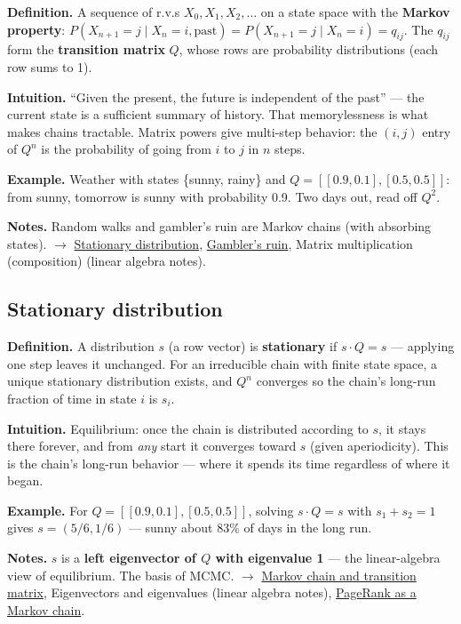 \documentclass[11pt,a4paper]{article}
\begin{document}
\textbf{Definition.} A sequence of r.v.s $X_{0}, X_{1}, X_{2}, \ldots$ on a state space with the \textbf{Markov property}: $P(X_{n+1} = j \mid X_{n} = i, \text{past}) = P(X_{n+1} = j \mid X_{n} = i) = q_{ij}$. The $q_{ij}$ form the \textbf{transition matrix} $Q$, whose rows are probability distributions (each row sums to 1).

\textbf{Intuition.} ``Given the present, the future is independent of the past'' --- the current state is a sufficient summary of history. That memorylessness is what makes chains tractable. Matrix powers give multi-step behavior: the $(i,j)$ entry of $Q^{n}$ is the probability of going from $i$ to $j$ in $n$ steps.

\textbf{Example.} Weather with states \{sunny, rainy\} and $Q = [[0.9, 0.1], [0.5, 0.5]]$: from sunny, tomorrow is sunny with probability 0.9. Two days out, read off $Q^{2}$.

\textbf{Notes.} Random walks and gambler's ruin are Markov chains (with absorbing states). $\to$ \hyperref[sec:stationary-distribution]{Stationary distribution}, \hyperref[sec:gamblers-ruin]{Gambler's ruin}, Matrix multiplication (composition) (linear algebra notes).

\subsection{Stationary distribution}\label{sec:stationary-distribution}

\textbf{Definition.} A distribution $s$ (a row vector) is \textbf{stationary} if $s\cdot Q = s$ --- applying one step leaves it unchanged. For an irreducible chain with finite state space, a unique stationary distribution exists, and $Q^{n}$ converges so the chain's long-run fraction of time in state $i$ is $s_{i}$.

\textbf{Intuition.} Equilibrium: once the chain is distributed according to $s$, it stays there forever, and from \textit{any} start it converges toward $s$ (given aperiodicity). This is the chain's long-run behavior --- where it spends its time regardless of where it began.

\textbf{Example.} For $Q = [[0.9, 0.1], [0.5, 0.5]]$, solving $s\cdot Q = s$ with $s_{1} + s_{2} = 1$ gives $s = (5/6, 1/6)$ --- sunny about 83\% of days in the long run.

\textbf{Notes.} $s$ is a \textbf{left eigenvector of $Q$ with eigenvalue 1} --- the linear-algebra view of equilibrium. The basis of MCMC. $\to$ \hyperref[sec:markov-chain-and-transition-matrix]{Markov chain and transition matrix}, Eigenvectors and eigenvalues (linear algebra notes), \hyperref[sec:pagerank-as-a-markov-chain]{PageRank as a Markov chain}.
\end{document}
